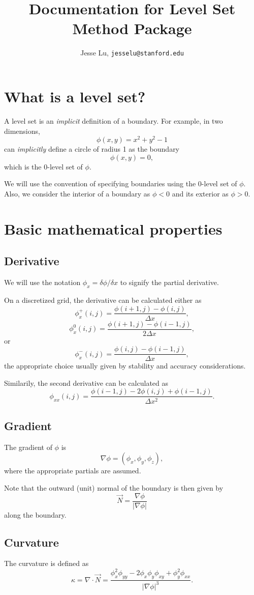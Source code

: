 \documentclass{article}
\title{Documentation for Level Set Method Package}
\author{Jesse Lu, \texttt{jesselu@stanford.edu}}
\newcommand{\be}{\begin{equation}}
\newcommand{\ee}{\end{equation}}
\newcommand{\grad}{\nabla}
\begin{document}
\maketitle
\tableofcontents

\section{What is a level set?}
A level set is an \emph{implicit} definition of a boundary. 
For example, in two dimensions, 
    \be \phi(x,y) = x^2 + y^2 - 1 \ee
can \emph{implicitly} define a circle of radius 1 as the boundary
    \be \phi(x,y) = 0, \ee
which is the 0-level set of $\phi$.

We will use the convention of specifying boundaries using the 0-level set of $\phi$. 
Also, we consider the interior of a boundary as $\phi<0$ and its exterior as $\phi>0$.


\section{Basic mathematical properties}
\subsection{Derivative}
We will use the notation $\phi_x= \delta \phi / \delta x$ to signify the partial derivative.

On a discretized grid, the derivative can be calculated either as
    \be \phi_x^+(i,j) = \frac{\phi(i+1,j) - \phi(i,j)}{\Delta x}, \ee
    \be \phi_x^0(i,j) = \frac{\phi(i+1,j) - \phi(i-1,j)}{2 \Delta x}, \ee
    or
    \be \phi_x^-(i,j) = \frac{\phi(i,j) - \phi(i-1,j)}{\Delta x}, \ee
the appropriate choice usually given by stability and accuracy considerations.

Similarily, the second derivative can be calculated as 
    \be \phi_{xx}(i,j) = \frac{\phi(i-1,j) - 2\phi(i,j) + \phi(i-1,j)}
        {\Delta x^2}. \ee

\subsection{Gradient}
The gradient of $\phi$ is 
    \be \grad\phi = (\phi_x, \phi_y, \phi_z), \ee
where the appropriate partials are assumed.

Note that the outward (unit) normal of the boundary is then given by
    \be \vec{N} = \frac{\grad\phi}{|\grad\phi|} \ee
along the boundary.

\subsection{Curvature}
The curvature is defined as
    \be \kappa = \grad \cdot \vec{N} = 
        \frac{\phi_x^2\phi_{yy} - 2\phi_x\phi_y\phi_{xy} + \phi_y^2\phi_{xx}}
        {|\grad\phi|^3}. \ee
\end{document}
